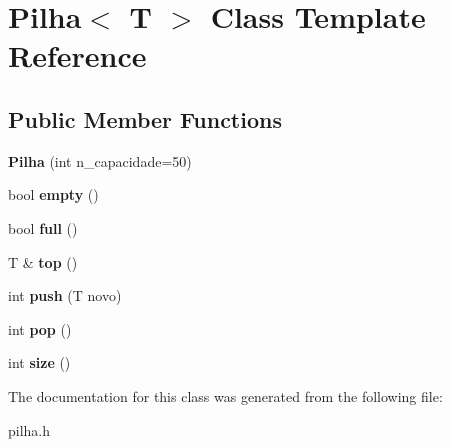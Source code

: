 \hypertarget{classPilha}{}\section{Pilha$<$ T $>$ Class Template Reference}
\label{classPilha}
\subsection*{Public Member Functions}
\begin{DoxyCompactItemize}
\item 
\mbox{\label{classPilha_a3113638095289f155d7c76db4b2da3df}} 
{\bfseries Pilha} (int n\+\_\+capacidade=50)
\item 
\mbox{\label{classPilha_a117c819eb1bff51136b7c72b486df0fc}} 
bool {\bfseries empty} ()
\item 
\mbox{\label{classPilha_ae9204010a17accede9ebd6e92c084c15}} 
bool {\bfseries full} ()
\item 
\mbox{\label{classPilha_adb80016e40c990aa1074f879b1ef7b89}} 
T \& {\bfseries top} ()
\item 
\mbox{\label{classPilha_a3f80cb860cfa58f459d7f484c9045879}} 
int {\bfseries push} (T novo)
\item 
\mbox{\label{classPilha_a720f99ec51a9d2e3ae2e59ab78365b84}} 
int {\bfseries pop} ()
\item 
\mbox{\label{classPilha_aae0f3f465788cefc53f9cadadc0e1fe0}} 
int {\bfseries size} ()
\end{DoxyCompactItemize}


The documentation for this class was generated from the following file\+:\begin{DoxyCompactItemize}
\item 
pilha.\+h\end{DoxyCompactItemize}
